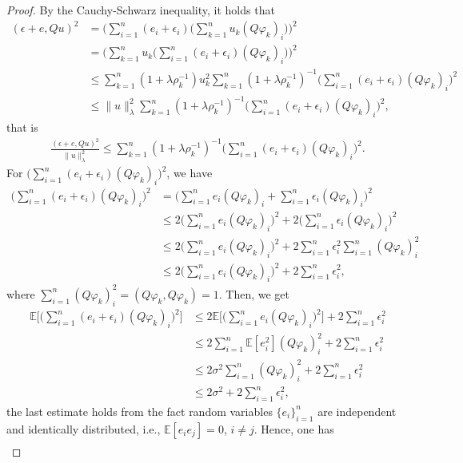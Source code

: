 \documentclass[10pt,a4paper]{amsart}
\begin{document}
\begin{proof}
By the Cauchy-Schwarz inequality, it holds that
\begin{align*}
(\epsilon+e,Qu)^2
&=\bigg(\sum_{i=1}^n(e_i+\epsilon_i)\bigg(\sum_{k=1}^nu_k(Q\varphi_k)_i\bigg)\bigg)^2\\
&=\bigg(\sum_{k=1}^nu_k\bigg(\sum_{i=1}^n(e_i+\epsilon_i)(Q\varphi_k)_i\bigg)\bigg)^2\\
&\leq \sum_{k=1}^n(1+\lambda\rho_k^{-1})u_k^2\sum_{k=1}^n(1+\lambda\rho_k^{-1})^{-1}\bigg(\sum_{i=1}^n(e_i+\epsilon_i)(Q\varphi_k)_i\bigg)^2\\
&\leq \| u\|_{\lambda}^2\sum_{k=1}^n(1+\lambda\rho_k^{-1})^{-1}\bigg(\sum_{i=1}^n(e_i+\epsilon_i)(Q\varphi_k)_i\bigg)^2,
\end{align*}
that is
\begin{align*}
\frac{(\epsilon+e,Qu)^2}{\| u\|_{\lambda}^2}
\leq \sum_{k=1}^n(1+\lambda\rho_k^{-1})^{-1}\bigg(\sum_{i=1}^n(e_i+\epsilon_i)(Q\varphi_k)_i\bigg)^2.
\end{align*}
For $\big(\sum_{i=1}^n(e_i+\epsilon_i)(Q\varphi_k)_i\big)^2$, we have
\begin{align*}
\bigg(\sum_{i=1}^n(e_i+\epsilon_i)(Q\varphi_k)_i\bigg)^2
&=\bigg(\sum_{i=1}^ne_i(Q\varphi_k)_i+\sum_{i=1}^n\epsilon_i(Q\varphi_k)_i\bigg)^2\\
&\leq 2\bigg(\sum_{i=1}^ne_i(Q\varphi_k)_i\bigg)^2+2\bigg(\sum_{i=1}^n\epsilon_i(Q\varphi_k)_i\bigg)^2\\
&\leq 2\bigg(\sum_{i=1}^ne_i(Q\varphi_k)_i\bigg)^2+2\sum_{i=1}^n\epsilon_i^2\sum_{i=1}^n(Q\varphi_k)_i^2\\
&\leq 2\bigg(\sum_{i=1}^ne_i(Q\varphi_k)_i\bigg)^2+2\sum_{i=1}^n\epsilon_i^2,
\end{align*}
where $\sum_{i=1}^n(Q\varphi_k)_i^2=(Q\varphi_k,Q\varphi_k)=1$.
Then, we get
\begin{align*}
\mathbb{E}\bigg[\bigg(\sum_{i=1}^n(e_i+\epsilon_i)(Q\varphi_k)_i\bigg)^2\bigg]
&\leq 2\mathbb{E}\bigg[\bigg(\sum_{i=1}^ne_i(Q\varphi_k)_i\bigg)^2\bigg]+2\sum_{i=1}^n\epsilon_i^2\\&
\leq 2\sum_{i=1}^n\mathbb{E}[e_i^2](Q\varphi_k)_i^2+2\sum_{i=1}^n\epsilon_i^2\\
&\leq 2\sigma^2\sum_{i=1}^n(Q\varphi_k)_i^2+2\sum_{i=1}^n\epsilon_i^2\\
&\leq 2\sigma^2+2\sum_{i=1}^n\epsilon_i^2,
\end{align*}
the last estimate holds from the fact random variables $\{e_i\}_{i=1}^n$ are independent and identically distributed, i.e., $\mathbb{E}[e_ie_j]=0$, $i\neq j$. Hence, one has
\begin{align*}

\end{align*}
\end{proof}
\end{document}
